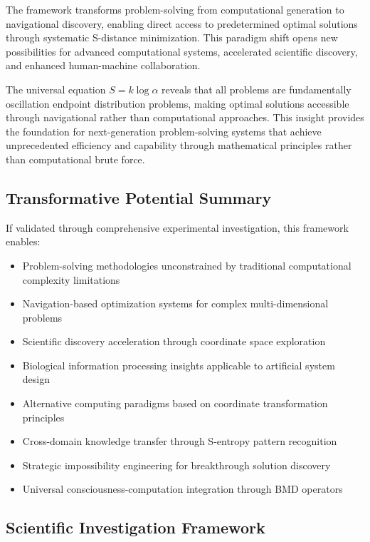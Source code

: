 \documentclass[11pt]{article}
\theoremstyle{definition}
\theoremstyle{remark}
\newcommand{\OscillationAmplitude}{\alpha}
\newcommand{\UniversalConstant}{k}
\begin{document}
{The framework transforms problem-solving from computational generation to navigational discovery, enabling direct access to predetermined optimal solutions through systematic S-distance minimization. This paradigm shift opens new possibilities for advanced computational systems, accelerated scientific discovery, and enhanced human-machine collaboration.

The universal equation $S = \UniversalConstant \log \OscillationAmplitude$ reveals that all problems are fundamentally oscillation endpoint distribution problems, making optimal solutions accessible through navigational rather than computational approaches. This insight provides the foundation for next-generation problem-solving systems that achieve unprecedented efficiency and capability through mathematical principles rather than computational brute force.

\subsection{Transformative Potential Summary}

If validated through comprehensive experimental investigation, this framework enables:

\begin{itemize}
\item Problem-solving methodologies unconstrained by traditional computational complexity limitations
\item Navigation-based optimization systems for complex multi-dimensional problems
\item Scientific discovery acceleration through coordinate space exploration
\item Biological information processing insights applicable to artificial system design
\item Alternative computing paradigms based on coordinate transformation principles
\item Cross-domain knowledge transfer through S-entropy pattern recognition
\item Strategic impossibility engineering for breakthrough solution discovery
\item Universal consciousness-computation integration through BMD operators
\end{itemize}

\subsection{Scientific Investigation Framework}

}
\end{document}

